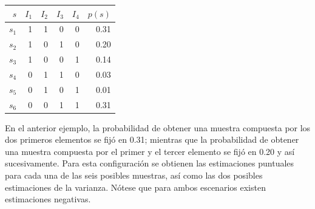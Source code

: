\documentclass[
  12pt,
]{book}
\begin{document}
\begin{longtable}[]{@{}rrrrrr@{}}
\toprule()
\(s\) & \(I_1\) & \(I_2\) & \(I_3\) & \(I_4\) & \(p(s)\) \\
\midrule()
\endhead
\(s_1\) & 1 & 1 & 0 & 0 & 0.31 \\
\(s_2\) & 1 & 0 & 1 & 0 & 0.20 \\
\(s_3\) & 1 & 0 & 0 & 1 & 0.14 \\
\(s_4\) & 0 & 1 & 1 & 0 & 0.03 \\
\(s_5\) & 0 & 1 & 0 & 1 & 0.01 \\
\(s_6\) & 0 & 0 & 1 & 1 & 0.31 \\
\bottomrule()
\end{longtable}

En el anterior ejemplo, la probabilidad de obtener una muestra compuesta por los dos primeros elementos se fijó en 0.31; mientras que la probabilidad de obtener una muestra compuesta por el primer y el tercer elemento se fijó en 0.20 y así sucesivamente. Para esta configuración se obtienen las estimaciones puntuales para cada una de las seis posibles muestras, así como las dos posibles estimaciones de la varianza. Nótese que para ambos escenarios existen estimaciones negativas.
\end{document}
